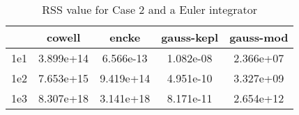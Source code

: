 \begin{table}
\centering
\begin{tabular}{|c|c|c|c|c|}
\hline
 & cowell & encke & gauss-kepl & gauss-mod \\
\hline
1e1 & 3.899e+14 & 6.566e-13 & 1.082e-08 & 2.366e+07 \\
\hline
1e2 & 7.653e+15 & 9.419e+14 & 4.951e-10 & 3.327e+09 \\
\hline
1e3 & 8.307e+18 & 3.141e+18 & 8.171e-11 & 2.654e+12 \\
\hline
\end{tabular}
\caption{RSS value for Case 2 and a Euler integrator}
\label{table:tab:keplerapprox_rss_C2_Euler}
\end{table}
